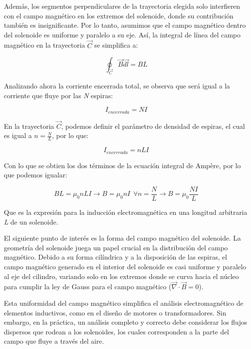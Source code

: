 Además, los segmentos perpendiculares de la trayectoria elegida solo interfieren con el campo magnético en los extremos del solenoide, donde su contribución también es insignificante. Por lo tanto, asumimos que el campo magnético dentro del solenoide es uniforme y paralelo a su eje. Así, la integral de línea del campo magnético en la trayectoria \(\vec C\) se simplifica a:

\begin{center}
    \[\oint_{\vec{C}}\vec{B} \vec{dl}=BL\]
\end{center}

Analizando ahora la corriente encerrada total, se observa que será igual a la corriente que fluye por las \textit{N} espiras:

\begin{center}
    \[I_{encerrada} = NI\]
\end{center}

En la trayectoria \(\vec{C}\), podemos definir el parámetro de densidad de espiras, el cual es igual a \(n=\frac{N}{L}\), por lo que:

\begin{center}
    \[I_{encerrada} = nLI\]
\end{center}

Con lo que se obtien los dos términos de la ecuación integral de Ampère, por lo que podemos igualar:

\begin{center}
    \[BL=\mu_0nLI\to B=\mu_0nI~~\forall n=\frac{N}{L}\to B=\mu_0\frac{NI}{L}\]
\end{center}

Que es la expresión para la inducción electromagnética en una longitud arbitraria \textit{L} de un solenoide.

El siguiente punto de interés es la forma del campo magnético del solenoide. La geometría del solenoide juega un papel crucial en la distribución del campo magnético. Debido a su forma cilíndrica y a la disposición de las espiras, el campo magnético generado en el interior del solenoide es casi uniforme y paralelo al eje del cilindro, variando solo en los extremos donde se curva hacia el núcleo para cumplir la ley de Gauss para el campo magnético (\(\vec{\nabla}\cdot\vec{B} = 0\)).

Esta uniformidad del campo magnético simplifica el análisis electromagnético de elementos inductivos, como en el diseño de motores o transformadores. Sin embargo, en la práctica, un análisis completo y correcto debe considerar los flujos dispersos que rodean a los solenoides, los cuales corresponden a la parte del campo que fluye a través del aire.

